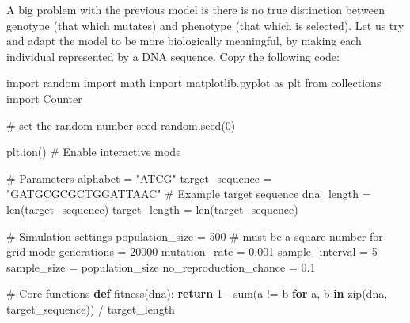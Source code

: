 \documentclass[
  letterpaper,
  DIV=11,
  numbers=noendperiod]{scrreprt}
\newenvironment{Shaded}{\begin{snugshade}}{\end{snugshade}}
\newcommand{\BuiltInTok}[1]{\textcolor[rgb]{0.00,0.23,0.31}{#1}}
\newcommand{\CommentTok}[1]{\textcolor[rgb]{0.37,0.37,0.37}{#1}}
\newcommand{\ControlFlowTok}[1]{\textcolor[rgb]{0.00,0.23,0.31}{\textbf{#1}}}
\newcommand{\DecValTok}[1]{\textcolor[rgb]{0.68,0.00,0.00}{#1}}
\newcommand{\FloatTok}[1]{\textcolor[rgb]{0.68,0.00,0.00}{#1}}
\newcommand{\ImportTok}[1]{\textcolor[rgb]{0.00,0.46,0.62}{#1}}
\newcommand{\KeywordTok}[1]{\textcolor[rgb]{0.00,0.23,0.31}{\textbf{#1}}}
\newcommand{\NormalTok}[1]{\textcolor[rgb]{0.00,0.23,0.31}{#1}}
\newcommand{\OperatorTok}[1]{\textcolor[rgb]{0.37,0.37,0.37}{#1}}
\newcommand{\StringTok}[1]{\textcolor[rgb]{0.13,0.47,0.30}{#1}}
\theoremstyle{definition}
\theoremstyle{remark}
\begin{document}
A big problem with the previous model is there is no true distinction
between genotype (that which mutates) and phenotype (that which is
selected). Let us try and adapt the model to be more biologically
meaningful, by making each individual represented by a DNA sequence.
Copy the following code:

\begin{tcolorbox}[enhanced jigsaw, leftrule=.75mm, colbacktitle=quarto-callout-note-color!10!white, coltitle=black, colback=white, left=2mm, bottomtitle=1mm, arc=.35mm, titlerule=0mm, breakable, bottomrule=.15mm, opacitybacktitle=0.6, colframe=quarto-callout-note-color-frame, title=\textcolor{quarto-callout-note-color}{\faInfo}\hspace{0.5em}{Starting code for ``evolving a DNA sequence''}, opacityback=0, toprule=.15mm, toptitle=1mm, rightrule=.15mm]

\begin{Shaded}
\begin{Highlighting}[]
\ImportTok{import}\NormalTok{ random}
\ImportTok{import}\NormalTok{ math}
\ImportTok{import}\NormalTok{ matplotlib.pyplot }\ImportTok{as}\NormalTok{ plt}
\ImportTok{from}\NormalTok{ collections }\ImportTok{import}\NormalTok{ Counter}

\CommentTok{\# set the random number seed}
\NormalTok{random.seed(}\DecValTok{0}\NormalTok{)}

\NormalTok{plt.ion()  }\CommentTok{\# Enable interactive mode}

\CommentTok{\# Parameters}
\NormalTok{alphabet }\OperatorTok{=} \StringTok{"ATCG"}
\NormalTok{target\_sequence }\OperatorTok{=} \StringTok{"GATGCGCGCTGGATTAAC"}  \CommentTok{\# Example target sequence}
\NormalTok{dna\_length }\OperatorTok{=} \BuiltInTok{len}\NormalTok{(target\_sequence)}
\NormalTok{target\_length }\OperatorTok{=} \BuiltInTok{len}\NormalTok{(target\_sequence)}

\CommentTok{\# Simulation settings}
\NormalTok{population\_size }\OperatorTok{=} \DecValTok{500}  \CommentTok{\# must be a square number for grid mode}
\NormalTok{generations }\OperatorTok{=} \DecValTok{20000}
\NormalTok{mutation\_rate }\OperatorTok{=} \FloatTok{0.001}
\NormalTok{sample\_interval }\OperatorTok{=} \DecValTok{5}
\NormalTok{sample\_size }\OperatorTok{=}\NormalTok{ population\_size}
\NormalTok{no\_reproduction\_chance }\OperatorTok{=} \FloatTok{0.1}

\CommentTok{\# Core functions}
\KeywordTok{def}\NormalTok{ fitness(dna):}
    \ControlFlowTok{return} \DecValTok{1} \OperatorTok{{-}} \BuiltInTok{sum}\NormalTok{(a }\OperatorTok{!=}\NormalTok{ b }\ControlFlowTok{for}\NormalTok{ a, b }\KeywordTok{in} \BuiltInTok{zip}\NormalTok{(dna, target\_sequence)) }\OperatorTok{/}\NormalTok{ target\_length}


\end{Highlighting}
\end{Shaded}
\end{tcolorbox}
\end{document}
